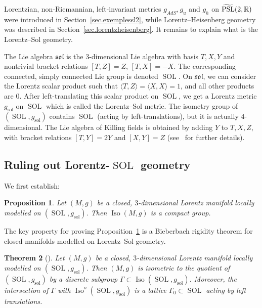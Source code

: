 \documentclass[11pt]{article}
\newtheorem{theo}{Theorem}[section]
\newtheorem{prop}[theo]{Proposition}
\theoremstyle{definition}
\numberwithin{equation}{section}
\numberwithin{figure}{section}
\numberwithin{table}{section}
\DeclareMathOperator{\Iso}{Iso}
\DeclareMathOperator{\PSL}{PSL}
\DeclareMathOperator{\Sol}{SOL}
\DeclareMathOperator{\sol}{sol}
\DeclareMathOperator{\SOL}{SOL}
\newcommand*\RR{\mathbb{R}}
\let\oldtilde\tilde
\renewcommand*\tilde[1]{\mathchoice{\widetilde{#1}}{\widetilde{#1}}{\widetilde{#1}}{\oldtilde{#1}}}
\newcommand*{\MK}{\mkern 2mu}
\begin{document}
Lorentzian, non-Riemannian, left-invariant metrics $g_{AdS},g_u$ and $g_h$ on $\tilde{\PSL}(2,\RR)$ were introduced in Section~\ref{sec.exemplessl2}, while Lorentz--Heisenberg geometry was described in Section~\ref{sec.lorentzheisenberg}. It remains to explain what is the Lorentz--Sol geometry.

The Lie algebra $\mathfrak{sol}$ is the $3$-dimensional Lie algebra with basis $T,X,Y$ and nontrivial bracket relations $[T,Z]=Z$, $[T,X]=-X$. The corresponding connected, simply connected Lie group is denoted $\SOL$. On $\mathfrak{sol}$, we can consider the Lorentz scalar product such that $\langle T,Z\rangle=\langle X,X\rangle=1$, and all other products are $0$. After left-translating this scalar product on $\SOL$, we get a Lorentz metric $g_{\sol}$ on $\SOL$ which is called the Lorentz--Sol metric. The isometry group of $(\Sol,g_{\sol})$ contains $\Sol$ (acting by left-translations), but it is actually $4$-dimensional. The Lie algebra of Killing fields is obtained by adding $Y$ to $T,X,Z$, with bracket relations $[T,Y]=2Y$ and $[X,Y]=Z$ (see~\cite[Section~4.2]{sorin.ghani} for further details).

\subsection{Ruling out Lorentz-\texorpdfstring{$\SOL$}{SOL} geometry}

We first establish:
\begin{prop}\label{prop.compacite.sol}
Let $(M,g)$ be a closed, $3$-dimensional Lorentz manifold locally modelled on $(\SOL,g_{\sol})$. Then $\Iso(M,g)$ is a compact group.
\end{prop}


The key property for proving Proposition~\ref{prop.compacite.sol} is a Bieberbach rigidity theorem for closed manifolds modelled on Lorentz--Sol geometry.

\begin{theo}[{\cite[Theorem~1.2$\MK$(iv), and Proof of Proposition~7.1]{sorin.ghani}}]\label{thm.bieberbach.sol}
Let $(M,g)$ be a closed, $3$-dimensional Lorentz manifold locally modelled on $(\SOL,g_{\sol})$. Then $(M,g)$ is isometric to the quotient of $(\SOL,g_{\sol})$ by a discrete subgroup $\Gamma \subset \Iso(\SOL,g_{\sol})$. Moreover, the intersection of $\Gamma$ with $\Iso^o(\SOL,g_{\sol})$ is a lattice $\Gamma_0 \subset \SOL$ acting by left translations.
\end{theo}
\end{document}
